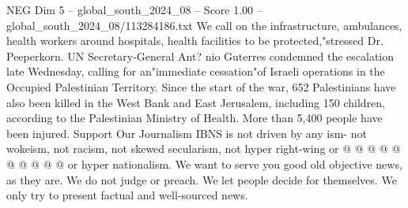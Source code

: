 \begin{textsample}{NEG Dim 5 – global\_south\_2024\_08 – Score 1.00 – global\_south\_2024\_08/113284186.txt}
We call on the infrastructure, ambulances, health workers around hospitals, health facilities to be protected,"stressed Dr.
Peeperkorn.
UN Secretary-General Ant? nio Guterres condemned the escalation late Wednesday, calling for an"immediate cessation"of Israeli operations in the Occupied Palestinian Territory.
Since the start of the war, 652 Palestinians have also been killed in the West Bank and East Jerusalem, including 150 children, according to the Palestinian Ministry of Health.
More than 5,400 people have been injured.
Support Our Journalism IBNS is not driven by any ism- not wokeism, not racism, not skewed secularism, not hyper right-wing or @ @ @ @ @ @ @ @ @ @ or hyper nationalism.
We want to serve you good old objective news, as they are.
We do not judge or preach.
We let people decide for themselves.
We only try to present factual and well-sourced news.

\end{textsample}
